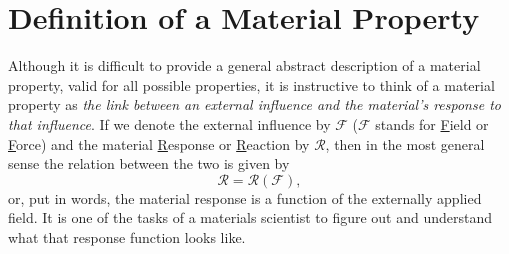 \section{Definition of a Material Property}

Although it is difficult to provide a general abstract description of a material property, valid for all possible properties, it is instructive to think of a material property as \textit{the link between an external influence and the material's response to that influence}.  If we denote the external influence by $\mathcal{F}$ ($\mathcal{F}$ stands for \underline{F}ield or \underline{F}orce) and the material \underline{R}esponse or \underline{R}eaction by $\mathcal{R}$, then in the most general sense the relation between the two is given by
\begin{equation}
	\mathcal{R}=\mathcal{R}(\mathcal{F}),\label{eq:rf}
\end{equation}
or, put in words, the material response is a function of the externally applied field.  It is one of the tasks of a materials scientist to figure out and understand what that response function looks like.

